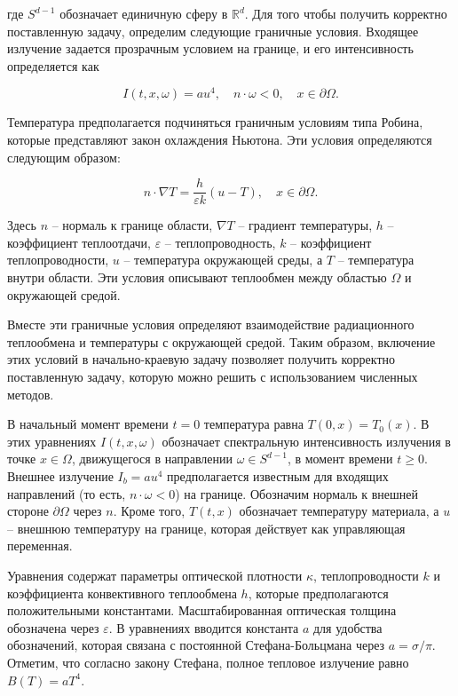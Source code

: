 где $S^{d-1}$ обозначает единичную сферу в $\mathbb{R}^{d}$.
Для того чтобы получить корректно поставленную задачу, определим
следующие граничные условия.
Входящее излучение задается прозрачным условием на границе,
и его интенсивность определяется как

\[
    I(t, x, \omega) = a u^{4}, \quad n \cdot \omega < 0,
    \quad x \in \partial \Omega.
\]

Температура предполагается подчиняться граничным условиям типа Робина,
которые представляют закон охлаждения Ньютона.
Эти условия определяются следующим образом:

\[
    n \cdot \nabla T = \frac{h}{\varepsilon k}(u - T),
    \quad x \in \partial \Omega.
\]

Здесь $n$ -- нормаль к границе области, $\nabla T$ -- градиент температуры,
$h$ -- коэффициент теплоотдачи, $\varepsilon$ -- теплопроводность,
$k$ -- коэффициент теплопроводности, $u$ -- температура окружающей среды,
а $T$ -- температура внутри области.
Эти условия описывают теплообмен между областью $\Omega$ и окружающей средой.

Вместе эти граничные условия определяют взаимодействие радиационного
теплообмена и температуры с окружающей средой.
Таким образом, включение этих условий в начально-краевую задачу
позволяет получить корректно поставленную задачу, которую можно
решить с использованием численных методов.

В начальный момент времени $t = 0$ температура равна $T(0, x) = T_{0}(x)$.
В этих уравнениях $I(t, x, \omega)$ обозначает спектральную интенсивность
излучения в точке $x \in \Omega$, движущегося в направлении $\omega \in S^{d-1}$,
в момент времени $t \geq 0$.
Внешнее излучение $I_{b} = a u^{4}$ предполагается известным для входящих
направлений (то есть, $n \cdot \omega < 0$) на границе.
Обозначим нормаль к внешней стороне $\partial \Omega$ через $n$.
Кроме того, $T(t, x)$ обозначает температуру материала, а $u$ -- внешнюю
температуру на границе, которая действует как управляющая переменная.

Уравнения содержат параметры оптической плотности $\kappa$,
теплопроводности $k$ и коэффициента конвективного теплообмена $h$,
которые предполагаются положительными константами.
Масштабированная оптическая толщина обозначена через $\varepsilon$.
В уравнениях вводится константа $a$ для удобства обозначений, которая
связана с постоянной Стефана-Больцмана через $a = \sigma / \pi$.
Отметим, что согласно закону Стефана,
полное тепловое излучение равно $B(T) = a T^{4}$.

